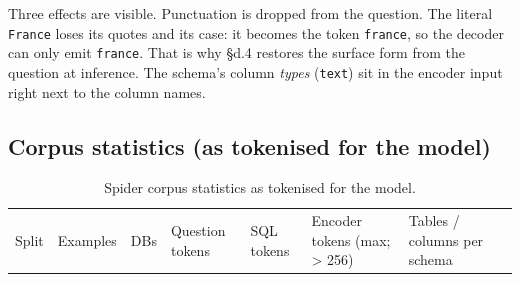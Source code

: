 \documentclass[
  10pt,
]{article}
\begin{document}
Three effects are visible. Punctuation is dropped from the question. The
literal \texttt{\textquotesingle{}France\textquotesingle{}} loses its
quotes and its case: it becomes the token \texttt{france}, so the
decoder can only emit \texttt{france}. That is why §d.4 restores the
surface form from the question at inference. The schema's column
\emph{types} (\texttt{text}) sit in the encoder input right next to the
column names.

\subsection{Corpus statistics (as tokenised for the
model)}\label{corpus-statistics-as-tokenised-for-the-model}

\begin{longtable}[]{@{}
  >{\raggedright\arraybackslash}p{}
  >{\raggedleft\arraybackslash}p{}
  >{\raggedleft\arraybackslash}p{}
  >{\raggedleft\arraybackslash}p{}
  >{\raggedleft\arraybackslash}p{}
  >{\raggedleft\arraybackslash}p{}
  >{\raggedleft\arraybackslash}p{}
  >{\raggedleft\arraybackslash}p{}@{}}
\caption{Spider corpus statistics as tokenised for the
model.}\tabularnewline
\toprule\noalign{}
\begin{minipage}[b]{\linewidth}\raggedright
Split
\end{minipage} & \begin{minipage}[b]{\linewidth}\raggedleft
Examples
\end{minipage} & \begin{minipage}[b]{\linewidth}\raggedleft
DBs
\end{minipage} & \begin{minipage}[b]{\linewidth}\raggedleft
Question tokens
\end{minipage} & \begin{minipage}[b]{\linewidth}\raggedleft
SQL tokens
\end{minipage} & \begin{minipage}[b]{\linewidth}\raggedleft
Encoder tokens (max; \textgreater{} 256)
\end{minipage} & \begin{minipage}[b]{\linewidth}\raggedleft
Tables / columns per schema

\end{minipage}
\end{longtable}
\end{document}
